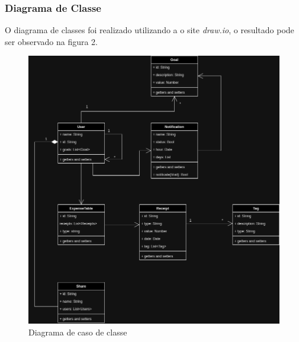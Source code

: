 \subsubsection{Diagrama de Classe}
O diagrama de classes foi realizado utilizando a o site \textit{draw.io}, o resultado pode ser observado na figura 2. 

\begin{figure}[h!]
    \centering
    \caption{Diagrama de caso de classe}
    \includegraphics[scale=0.4]{images/money-tracker-Class-Diagram.png}
\end{figure}